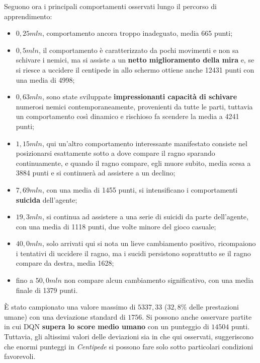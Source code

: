 \documentclass[twoside,twocolumn,10pt]{extarticle}
\theoremstyle{definition}
\begin{document}
			Seguono ora i principali comportamenti osservati lungo il percorso di apprendimento:			
			\begin{itemize}
				\item $0,25mln$, comportamento ancora troppo inadeguato, media 665 punti;
				\item $0,5mln$, il comportamento è caratterizzato da pochi movimenti e non sa schivare i nemici, ma si assiste a un \textbf{netto miglioramento della mira} e, se si riesce a uccidere il centipede in allo schermo ottiene anche 12431 punti con una media di 4998;
				\item $0,63mln$, sono state sviluppate \textbf{impressionanti capacità di schivare} numerosi nemici contemporaneamente, provenienti da tutte le parti, tuttavia un comportamento così dinamico e rischioso fa scendere la media a 4241 punti;
				\item $1,15mln$, qui un'altro comportamento interessante manifestato consiste nel posizionarsi esattamente sotto a dove compare il ragno sparando continuamente, e quando il ragno compare, egli muore subito, media scesa a 3884 punti e si continuerà ad assistere a un declino;
				\item $7,69mln$, con una media di 1455 punti, si intensificano i comportamenti \textbf{suicida} dell'agente;
				\item $19,3mln$, si continua ad assistere a una serie di suicidi da parte dell'agente, con una media di 1118 punti, due volte minore del gioco casuale;
				\item $40,0mln$, solo arrivati qui si nota un lieve cambiamento positivo, ricompaiono i tentativi di uccidere il ragno, ma i sucidi persistono soprattutto se il ragno compare da destra, media 1628;
				\item fino a $50,0mln$ non compare alcun cambiamento significativo, con una media finale di 1379 punti.
			\end{itemize}
			
			È stato campionato una valore massimo di $5337,33$ ($32,8\%$ delle prestazioni umane) con una deviazione standard di $1756$. Si possono anche osservare partite in cui DQN \textbf{supera lo score medio umano} con un punteggio di $14504$ punti. Tuttavia, gli altissimi valori delle deviazioni sia in \cite{bib:dqn} che qui osservati, suggeriscono che enormi punteggi in \textit{Centipede} si possono fare solo sotto particolari condizioni favorevoli.
		
\end{document}
